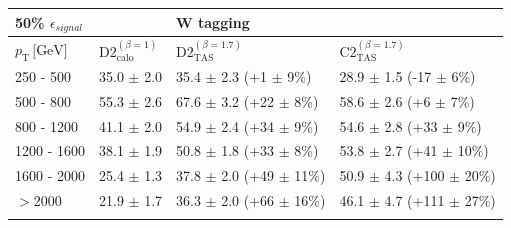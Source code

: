 \begin{table}[]
\centering
\begin{tabular}{llll}
 \multicolumn{1}{l||}{\textbf{50\% $\epsilon_{signal}$}} &                                                & \textbf{W tagging}                                         &                                          \\ \hline
\multicolumn{1}{l||}{$p_{\mathrm{T}} \, \text{[GeV]}$}           & \multicolumn{1}{l|}{$\text{D2}_{\text{calo}}^{(\beta=1)}$} & \multicolumn{1}{l|}{$\text{D2}_{\text{TAS}}^{(\beta=1.7)}$} & \multicolumn{1}{l|}{$\text{C2}_{\text{TAS}}^{(\beta=1.7)}$} \\ \hline \hline
\multicolumn{1}{l||}{250 - 500}                       & \multicolumn{1}{l|}{35.0 $\pm$ 2.0}                      & \multicolumn{1}{l|}{\cellcolor{Red!50}35.4 $\pm$ 2.3 (+1 $\pm$ 9\%)}         & \multicolumn{1}{l|}{28.9 $\pm$ 1.5 (-17 $\pm$ 6\%)}        \\
\multicolumn{1}{l||}{500 - 800}                       & \multicolumn{1}{l|}{55.3 $\pm$ 2.6}                      & \multicolumn{1}{l|}{\cellcolor{Red!50}67.6 $\pm$ 3.2 (+22 $\pm$ 8\%)}        & \multicolumn{1}{l|}{58.6 $\pm$ 2.6 (+6 $\pm$ 7\%)}         \\
\multicolumn{1}{l||}{800 - 1200}                      & \multicolumn{1}{l|}{41.1 $\pm$ 2.0}                      & \multicolumn{1}{l|}{\cellcolor{Red!50}54.9 $\pm$ 2.4 (+34 $\pm$ 9\%)}        & \multicolumn{1}{l|}{54.6 $\pm$ 2.8 (+33 $\pm$ 9\%)}        \\
\multicolumn{1}{l||}{1200 - 1600}                     & \multicolumn{1}{l|}{38.1 $\pm$ 1.9}                      & \multicolumn{1}{l|}{50.8 $\pm$ 1.8 (+33 $\pm$ 8\%)}        & \multicolumn{1}{l|}{\cellcolor{Red!50}53.8 $\pm$ 2.7 (+41 $\pm$ 10\%)}        \\
\multicolumn{1}{l||}{1600 - 2000}                     & \multicolumn{1}{l|}{25.4 $\pm$ 1.3}                      & \multicolumn{1}{l|}{37.8 $\pm$ 2.0 (+49 $\pm$ 11\%)}       & \multicolumn{1}{l|}{\cellcolor{Red!50}50.9 $\pm$ 4.3 (+100 $\pm$ 20\%)}       \\
\multicolumn{1}{l||}{$>2000$}                         & \multicolumn{1}{l|}{21.9 $\pm$ 1.7}                      & \multicolumn{1}{l|}{36.3 $\pm$ 2.0 (+66 $\pm$ 16\%)}       & \multicolumn{1}{l|}{\cellcolor{Red!50}46.1 $\pm$ 4.7 (+111 $\pm$ 27\%)}       \\ \hline
                                                     &                                                &                                          &                                          \\

\end{tabular}
\end{table}
